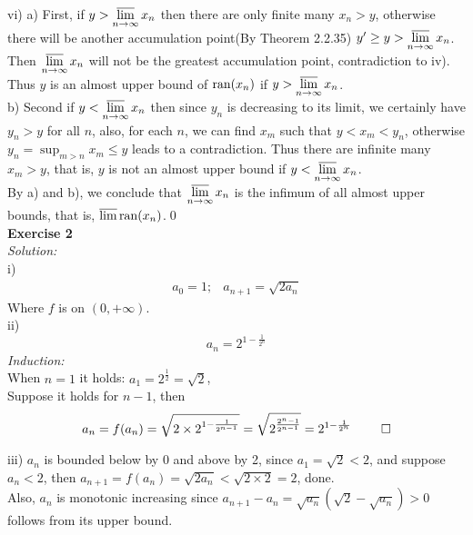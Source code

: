 \documentclass[12pt]{article}
\begin{document}
vi) a) First, if $\displaystyle y>\varlimsup_{n\to\infty}x_n$ then there are only finite many $x_n>y$, otherwise there will be another accumulation point(By Theorem 2.2.35) $y'\ge y>\displaystyle \varlimsup_{n\to\infty}x_n$. Then $\displaystyle \varlimsup_{n\to\infty}x_n$ will not be the greatest accumulation point, contradiction to iv). Thus $y$ is an almost upper bound of ${\rm ran}(x_n)$ if $\displaystyle y>\varlimsup_{n\to\infty}x_n$.\\
b) Second if $\displaystyle y<\varlimsup_{n\to\infty}x_n$ then since $y_n$ is decreasing to its limit, we certainly have $y_n>y$ for all $n$, also, for each $n$, we can find $x_m$ such that $y<x_m<y_n$, otherwise $\displaystyle y_n=\sup_{m>n}{x_m}\leq y$ leads to a contradiction. Thus there are infinite many $x_m>y$, that is, $y$ is not an almost upper bound if $\displaystyle y<\varlimsup_{n\to\infty}x_n$.\\
By a) and b), we conclude that $\displaystyle\varlimsup_{n\to\infty}x_n$ is the infimum of all almost upper bounds, that is, $\varlimsup{\rm ran}(x_n)$.\qed\\
\eject
\textbf{Exercise 2}\\ 
\textit{Solution:}\\
i)
\begin{align*}
&a_0=1;& a_{n+1}=\sqrt{2a_n}&
\end{align*}
Where $f$ is on $(0,+\infty)$.\\
ii)
\[
a_n=2^{1-\frac{1}{2^n}}
\]
\textit{Induction:}\\
When $n=1$ it holds: $a_1=2^{\frac{1}{2}}=\sqrt2$,\\
Suppose it holds for $n-1$, then
\[
a_n=f(a_n)=\sqrt{2\times2^{1-\frac{1}{2^{n-1}}}}=\sqrt{2^{\frac{2^n-1}{2^{n-1}}}}=2^{1-\frac{1}{2^n}}~\qed
\]

iii)
$a_n$ is bounded below by 0 and above by 2, since 
$a_1=\sqrt2<2$, and suppose $a_n<2$, then $a_{n+1}=f(a_n)=\sqrt{2a_n}<\sqrt{2\times2}=2$, done.\\
Also, $a_n$ is monotonic increasing since $a_{n+1}-a_n=\sqrt{a_n}(\sqrt2-\sqrt{a_n})>0$ follows from its upper bound.\\
\end{document}
